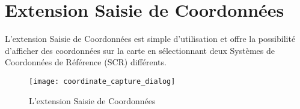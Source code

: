 % 

\section{Extension Saisie de Coordonnées}



L'extension Saisie de Coordonnées est simple d'utilisation et offre la
possibilité d'afficher des coordonnées sur la carte en sélectionnant deux
Systèmes de Coordonnées de Référence (SCR) différents.


\begin{figure}[ht]
   \begin{center}
   \texttt{[image: coordinate\_capture\_dialog]}
   \caption{L'extension Saisie de Coordonnées \nixcaption}\label{fig:coordinate_capture_dialog}
\end{center}  
\end{figure}

